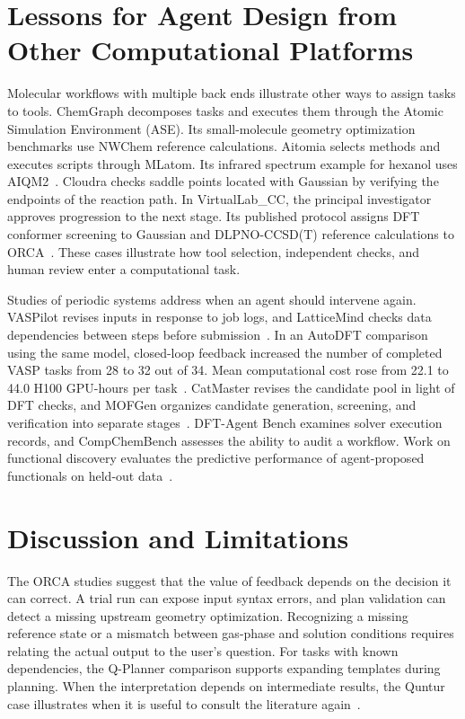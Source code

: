 \documentclass[a4paper,11pt]{article}
\begin{document}
\section{Lessons for Agent Design from Other Computational Platforms}
Molecular workflows with multiple back ends illustrate other ways to assign
tasks to tools.
ChemGraph decomposes tasks and executes them through the Atomic Simulation
Environment (ASE). Its small-molecule geometry optimization benchmarks use
NWChem reference calculations.
Aitomia selects methods and executes scripts through MLatom. Its infrared
spectrum example for hexanol uses AIQM2~\cite{chemgraph,aitomia}.
Cloudra checks saddle points located with Gaussian by verifying the endpoints
of the reaction path.
In VirtualLab\_CC, the principal investigator approves progression to the next
stage. Its published protocol assigns DFT conformer screening to Gaussian
and DLPNO-CCSD(T) reference calculations to ORCA~\cite{cloudra,virtuallab}.
These cases illustrate how tool selection, independent checks, and human
review enter a computational task.

Studies of periodic systems address when an agent should intervene again.
VASPilot revises inputs in response to job logs, and LatticeMind checks data
dependencies between steps before submission~\cite{vaspilot,lattice}.
In an AutoDFT comparison using the same model, closed-loop feedback increased
the number of completed VASP tasks from 28 to 32 out of 34.
Mean computational cost rose from 22.1 to 44.0 H100 GPU-hours per
task~\cite{autodft}.
CatMaster revises the candidate pool in light of DFT checks, and MOFGen organizes
candidate generation, screening, and verification into separate
stages~\cite{catmaster,mofgen}.
DFT-Agent Bench examines solver execution records, and CompChemBench assesses
the ability to audit a workflow.
Work on functional discovery evaluates the predictive performance of
agent-proposed functionals on held-out data~\cite{dftbench,compbench,xc}.

\section{Discussion and Limitations}
The ORCA studies suggest that the value of feedback depends on the decision
it can correct.
A trial run can expose input syntax errors, and plan validation can detect
a missing upstream geometry optimization.
Recognizing a missing reference state or a mismatch between gas-phase and
solution conditions requires relating the actual output to the user's question.
For tasks with known dependencies, the Q-Planner comparison supports expanding
templates during planning.
When the interpretation depends on intermediate results, the Quntur case
illustrates when it is useful to consult the literature again~\cite{qplanner,quntur}.
\end{document}
